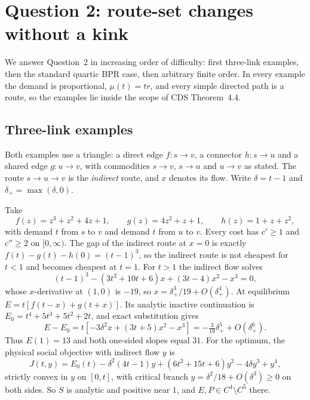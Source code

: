 \section{Question 2: route-set changes without a kink}\label{sec:transitions}

We answer Question~2 in increasing order of difficulty: first three-link examples, then the standard quartic BPR case, then arbitrary finite order. In every example the demand is proportional, $\mu(t)=tr$, and every simple directed path is a route, so the examples lie inside the scope of CDS Theorem~4.4.

\subsection{Three-link examples}\label{sec:smallexamples}

Both examples use a triangle: a direct edge $f:s\to v$, a connector $h:s\to u$ and a shared edge $g:u\to v$, with commodities $s\to v$, $s\to u$ and $u\to v$ as stated. The route $s\to u\to v$ is the \emph{indirect} route, and $x$ denotes its flow. Write $\delta=t-1$ and $\delta_+=\max(\delta,0)$.

\begin{example}\label{ex:cubic}
Take
\begin{equation}\label{eq:polynomialtriangle}
 f(z)=z^3+z^2+4z+1,\qquad g(z)=4z^2+z+1,\qquad h(z)=1+z+z^2,
\end{equation}
with demand $t$ from $s$ to $v$ and demand $t$ from $u$ to $v$. Every cost has $c'\ge1$ and $c''\ge2$ on $[0,\infty)$. The gap of the indirect route at $x=0$ is exactly $f(t)-g(t)-h(0)=(t-1)^3$, so the indirect route is not cheapest for $t<1$ and becomes cheapest at $t=1$. For $t>1$ the indirect flow solves
\begin{equation}\label{eq:triangleflow}
 (t-1)^3-(3t^2+10t+6)x+(3t-4)x^2-x^3=0,
\end{equation}
whose $x$-derivative at $(1,0)$ is $-19$, so $x=\delta_+^3/19+O(\delta_+^4)$. At equilibrium $E=t[f(t-x)+g(t+x)]$. Its analytic inactive continuation is $E_0=t^4+5t^3+5t^2+2t$, and exact substitution gives
\[
 E-E_0=t[-3\delta^2x+(3t+5)x^2-x^3]=-\tfrac3{19}\delta_+^5+O(\delta_+^6).
\]
Thus $E(1)=13$ and both one-sided slopes equal $31$. For the optimum, the physical social objective with indirect flow $y$ is
\[
 J(t,y)=E_0(t)-\delta^2(4t-1)y+(6t^2+15t+6)y^2-4\delta y^3+y^4,
\]
strictly convex in $y$ on $[0,t]$, with critical branch $y=\delta^2/18+O(\delta^3)\ge0$ on both sides. So $S$ is analytic and positive near $1$, and $E,P\in C^4\setminus C^5$ there. 
\end{example}


